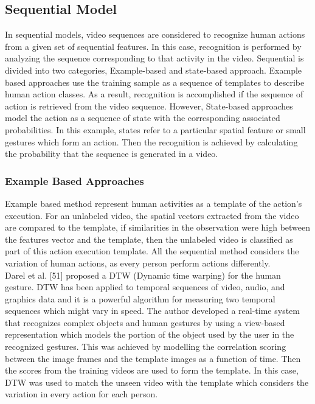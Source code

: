 \subsection{Sequential Model}
\hspace{5mm} In sequential models, video sequences are considered to recognize human actions from a given set of sequential features. In this case, recognition is performed by analyzing the sequence corresponding to that activity in the video. Sequential is divided into two categories, Example-based and state-based approach. Example based approaches use the training sample as a sequence of templates to describe human action classes. As a result, recognition is accomplished if the sequence of action is retrieved from the video sequence. However, State-based approaches model the action as a sequence of state with the corresponding associated probabilities. In this example, states refer to a particular spatial feature or small gestures which form an action. Then the recognition is achieved by calculating the probability that the sequence is generated in a video.

\subsubsection{Example Based Approaches}
\hspace{5mm} Example based method represent human activities as a template of the action’s execution. For an unlabeled video, the spatial vectors extracted from the video are compared to the template, if similarities in the observation were high between the features vector and the template, then the unlabeled video is classified as part of this action execution template. All the sequential method considers the variation of human actions, as every person perform actions differently.\\ 

Darel et al. [51] proposed a DTW (Dynamic time warping) for the human gesture. DTW has been applied to temporal sequences of video, audio, and graphics data and it is a powerful algorithm for measuring two temporal sequences which might vary in speed. The author developed a real-time system that recognizes complex objects and human gestures by using a view-based representation which models the portion of the object used by the user in the recognized gestures. This was achieved by modelling the correlation scoring between the image frames and the template images as a function of time. Then the scores from the training videos are used to form the template. In this case, DTW was used to match the unseen video with the template which considers the variation in every action for each person.\\

